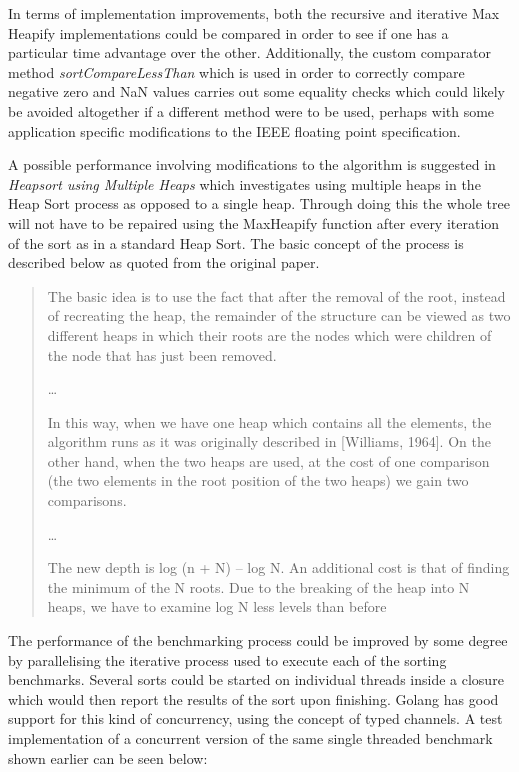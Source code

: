 \documentclass{article}
\begin{document}
In terms of implementation improvements, both the recursive and iterative Max Heapify implementations could be compared in order to see if one has a particular time advantage over the other. Additionally, the custom comparator method \textit{sortCompareLessThan} which is used in order to correctly compare negative zero and NaN values carries out some equality checks which could likely be avoided altogether if a different method were to be used, perhaps with some application specific modifications to the IEEE floating point specification.

A possible performance involving modifications to the algorithm is suggested in \textit{Heapsort using Multiple Heaps} \cite{multipleheaps} which investigates using multiple heaps in the Heap Sort process as opposed to a single heap. Through doing this the whole tree will not have to be repaired using the MaxHeapify function after every iteration of the sort as in a standard Heap Sort. The basic concept of the process is described below as quoted from the original paper.

\begin{quote}
\begin{center}
The basic idea is to use the fact that after the removal of the root, instead of recreating
the heap, the remainder of the structure can be viewed as two different heaps in which
their roots are the nodes which were children of the node that has just been removed.

\dots

In this way, when we have one heap which contains all the elements, the algorithm
runs as it was originally described in [Williams, 1964]. On the other hand, when the
two heaps are used, at the cost of one comparison (the two elements in the root
position of the two heaps) we gain two comparisons.

\dots

The new depth is log (n + N) – log N. An
additional cost is that of finding the minimum of the N roots. Due to the breaking of
the heap into N heaps, we have to examine log N less levels than before
\end{center}
\cite{multipleheaps}
\end{quote}

The performance of the benchmarking process could be improved by some degree by parallelising the iterative process used to execute each of the sorting benchmarks. Several sorts could be started on individual threads inside a closure which would then report the results of the sort upon finishing. Golang has good support for this kind of concurrency, using the concept of typed channels. A test implementation of a concurrent version of the same single threaded benchmark shown earlier can be seen below:
\end{document}
